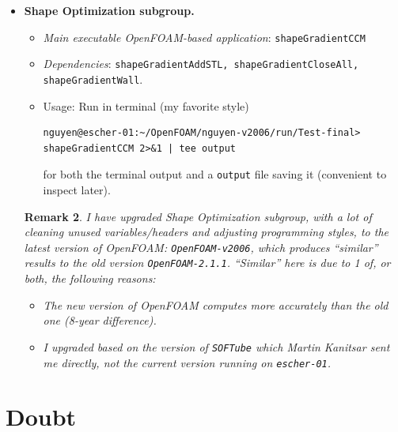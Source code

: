 \documentclass[onsided]{book}
\numberwithin{equation}{section}
\newtheorem{remark}{Remark}[section]
\begin{document}
\begin{enumerate}
\begin{itemize}
\begin{itemize}
            \begin{remark}
                I have not upgraded, and unintended to at the moment, \texttt{topoOpt} due to several doubts/concerns listed in Chap. 2.
            \end{remark}
        \end{itemize}  
        \item \textbf{Shape Optimization subgroup.}
        \begin{itemize}
            \item \textit{Main executable OpenFOAM-based application}: \texttt{shapeGradientCCM}
            \item \textit{Dependencies}: \texttt{shapeGradientAddSTL, shapeGradientCloseAll, shapeGradientWall}.
            \item Usage: Run in terminal (my favorite style)
            \begin{verbatim}
nguyen@escher-01:~/OpenFOAM/nguyen-v2006/run/Test-final> shapeGradientCCM 2>&1 | tee output
            \end{verbatim}
            for both the terminal output and a \texttt{output} file saving it (convenient to inspect later).
        \end{itemize}
    
        \begin{remark}
            I have upgraded Shape Optimization subgroup, with a lot of cleaning unused variables/headers and adjusting programming styles, to the latest version of OpenFOAM: \texttt{OpenFOAM-v2006}, which produces ``similar'' results to the old version \texttt{OpenFOAM-2.1.1}. ``Similar'' here is due to 1 of, or both, the following reasons:
            \begin{itemize}
                \item The new version of OpenFOAM computes more accurately than the old one (8-year difference).
                \item I upgraded based on the version of \texttt{SOFTube} which Martin Kanitsar sent me directly, not the current version running on \texttt{escher-01}.
            \end{itemize}
        \end{remark}
    \end{itemize}
\end{enumerate}


\chapter{Doubt}
\end{document}
